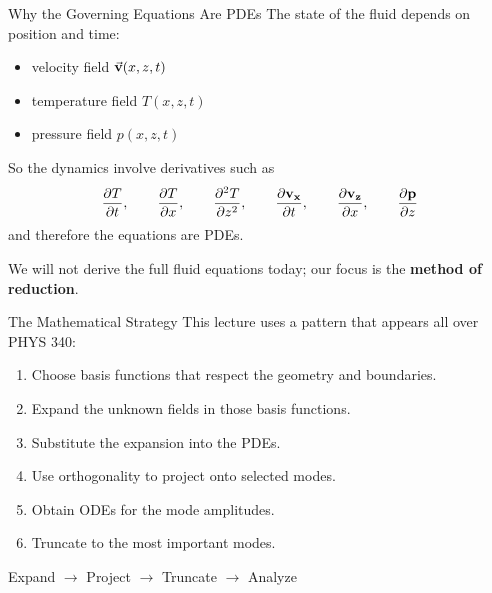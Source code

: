 \documentclass[aspectratio=169]{beamer}
\begin{document}
\begin{frame}{Why the Governing Equations Are PDEs}
The state of the fluid depends on position and time:
\begin{itemize}
\item velocity field $\vec{\vb{v}}(x,z,t)$
\item temperature field $T(x,z,t)$
\item pressure field $p(x,z,t)$
\end{itemize}

So the dynamics involve derivatives such as
\begin{equation*}
\pdv{T}{t}, \qquad \pdv{T}{x}, \qquad \pdv[2]{T}{z}, \qquad \pdv{\vb{v_x}}{t}, \qquad \pdv{\vb{v_z}}{x}, \qquad \pdv{\vb{p}}{z}
\end{equation*}
and therefore the equations are PDEs.

\vspace{0.5em}

We will not derive the full fluid equations today; our focus is the \textbf{method of reduction}.
\end{frame}

\begin{frame}{The Mathematical Strategy}
This lecture uses a pattern that appears all over PHYS 340:
\begin{enumerate}
\item Choose basis functions that respect the geometry and boundaries.
\item Expand the unknown fields in those basis functions.
\item Substitute the expansion into the PDEs.
\item Use orthogonality to project onto selected modes.
\item Obtain ODEs for the mode amplitudes.
\item Truncate to the most important modes.
\end{enumerate}

\begin{center}
\Large
Expand $\rightarrow$ Project $\rightarrow$ Truncate $\rightarrow$ Analyze
\end{center}
\end{frame}
\end{document}
